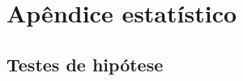 \titleformat{\chapter}[display]{\normalfont\huge}{\appendixname{} \thechapter}{20pt}{\bfseries\huge}
\chapter{Apêndice estatístico}
\label{Append_Stat}

\section{Testes de hipótese}








